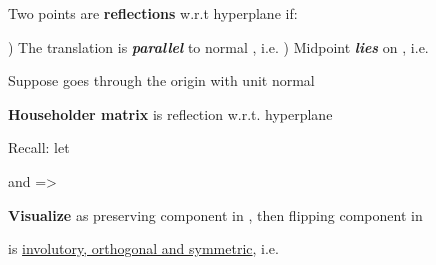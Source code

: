 \begin{itemize}

      \vItem
            Two points  are
            \textbf{reflections} w.r.t hyperplane
             if:

            \begin{enumerate}
                  )
                        The translation
                        is \textbf{\emph{parallel}} to normal ,
                        i.e. 
                  )
                        Midpoint 
                        \textbf{\emph{lies}} on ,
                        i.e. 
            \end{enumerate}
      \vItem
            Suppose
            goes through the origin with unit normal 

            \begin{itemize}

                  \vItem
                        \textbf{Householder matrix}
                        is reflection w.r.t. hyperplane 

                  \vItem
                        Recall: let

                        \tcbbreak

                        \begin{itemize}

                              \vItem
                                    and
                                    =>
                                    
                              \vItem
                                    \textbf{Visualize} as preserving component in
                                    , then flipping component in 
                        \end{itemize}
                  \vItem
                         is \underline{involutory, orthogonal and symmetric},
                        i.e. 
            \end{itemize}
\end{itemize}
